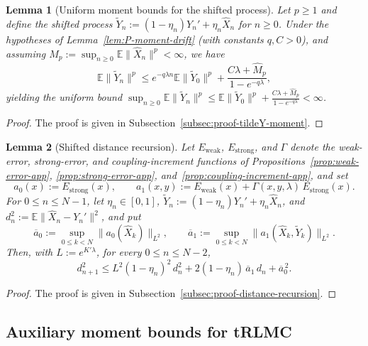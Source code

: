 \documentclass[11pt,a4paper,reqno]{amsart}
\theoremstyle{plain}
\newtheorem{lemma}{Lemma}
\theoremstyle{definition}
\theoremstyle{remark}
\newcommand{\E}{\mathbb{E}}
\begin{document}
\begin{lemma}[Uniform moment bounds for the shifted process]\label{lem:tildeY-moment}
Let $p\ge 1$ and define the shifted process $\widetilde Y_n := (1-\eta_n)Y_n' + \eta_n \widehat X_n$ for $n\ge0$. Under the hypotheses of Lemma~\ref{lem:P-moment-drift} (with constants $q, C > 0$), and assuming $\widehat M_p := \sup_{n\ge 0} \E\|\widehat X_n\|^p < \infty$, we have
\[
  \E\|\widetilde Y_n\|^p \le e^{-q\lambda n}\E\|\widetilde Y_0\|^p + \frac{C\lambda+\widehat M_p}{1-e^{-q\lambda}},
\]
yielding the uniform bound $\sup_{n\ge 0} \E\|\widetilde Y_n\|^p \le \E\|\widetilde Y_0\|^p + \frac{C\lambda+\widehat M_p}{1-e^{-q\lambda}} < \infty$.
\end{lemma}

\begin{proof}
The proof is given in Subsection~\ref{subsec:proof-tildeY-moment}.
\end{proof}


\begin{lemma}[Shifted distance recursion]
\label{lem:distance-recursion-app}
Let $E_{\mathrm{weak}}$, $E_{\mathrm{strong}}$, and $\Gamma$ denote the weak-error,
strong-error, and coupling-increment functions of
Propositions~\ref{prop:weak-error-app}, \ref{prop:strong-error-app},
and~\ref{prop:coupling-increment-app}, and set
\[
  a_0(x):=E_{\mathrm{strong}}(x),
  \qquad
  a_1(x,y):=E_{\mathrm{weak}}(x)+\Gamma(x,y,\lambda)\,E_{\mathrm{strong}}(x).
\]
For $0\le n\le N-1$, let $\eta_n\in[0,1]$,
$\widetilde Y_n:=(1-\eta_n)Y_n'+\eta_n\widehat X_n$, and
$d_n^2:=\E\|\widehat X_n-Y_n'\|^2$, and put
\[
  \overline a_0
  :=\sup_{0\le k<N}\|a_0(\widehat X_k)\|_{L^2},
  \qquad
  \overline a_1
  :=\sup_{0\le k<N}\|a_1(\widehat X_k,\widetilde Y_k)\|_{L^2}.
\]
Then, with $L:=e^{K'\lambda}$, for every $0\le n\le N-2$,
\[
  d_{n+1}^2
  \le
  L^2(1-\eta_n)^2\,d_n^2
  +2(1-\eta_n)\,\overline a_1\,d_n
  +\overline a_0^{\,2}.
\]
\end{lemma}

\begin{proof}
The proof is given in Subsection~\ref{subsec:proof-distance-recursion}.
\end{proof}


\subsection{Auxiliary moment bounds for tRLMC}
\end{document}
